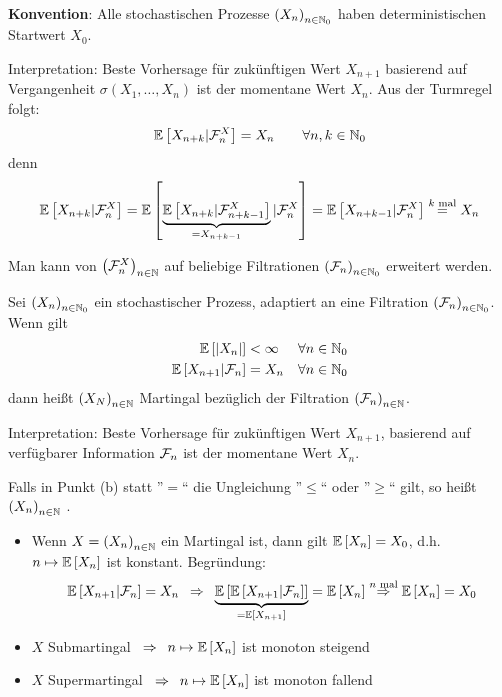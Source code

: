 \textbf{Konvention}: Alle stochastischen Prozesse $\left( X_n \right)_{n \in \mathbb{N}_0}$ haben deterministischen Startwert $X_0$.

Interpretation: Beste Vorhersage für zukünftigen Wert $X_{n+1}$ basierend auf Vergangenheit $\sigma(X_1,\dots,X_n)$ ist der momentane Wert $X_n$.
Aus der Turmregel folgt:
\begin{equation*}
	\EW[X_{n+k}|\F_n^X] = X_n \qquad \forall n,k \in \N_0 %
\end{equation*}
denn
\begin{equation*}
	\mathbb{E} \left[ X_{n+k}|\mathcal{F}_n^X \right] = \mathbb{E} \left[ \underbrace{\mathbb{E} \left[ X_{n+k}|\mathcal{F}_{n+k-1}^X \right]}_{=X_{n+k-1}}|\mathcal{F}_n^X \right] = \mathbb{E} \left[ X_{n+k-1}|\mathcal{F}_n^X \right] \overset{k \text{ mal}}{=} X_n
\end{equation*}

Man kann von $\left( \mathcal{F}_n^X \right)_{n \in \mathbb{N}}$ auf beliebige Filtrationen $\left( \mathcal{F}_n \right)_{n \in \mathbb{N}_0}$ erweitert werden.

\begin{*definition}
	Sei $\left( X_n \right)_{n \in \mathbb{N}_0}$ ein stochastischer Prozess, adaptiert an eine Filtration $\left( \mathcal{F}_n \right)_{n \in \mathbb{N}_0}$. Wenn gilt
	\begin{alignat*}{2}
		\EW[\abs{X_n}] &< \infty &\forall n \in \N_0 \\ %
		\EW[X_{n+1}|\F_n] &= X_n &\forall n \in \N_0    %
	\end{alignat*}
	dann heißt $\left( X_N \right)_{n \in \mathbb{N}}$ Martingal bezüglich der Filtration $\left( \mathcal{F}_n \right)_{n \in \mathbb{N}}$.
\end{*definition}

Interpretation: Beste Vorhersage für zukünftigen Wert $X_{n+1}$, basierend auf verfügbarer Information $\mathcal{F}_n$ ist der momentane Wert $X_n$.

\begin{*definition}
	Falls in Punkt (b) statt ''$=$`` die Ungleichung ''$\le$`` oder ''$\ge$`` gilt, so heißt $\left( X_n \right)_{n \in \mathbb{N}}$ .
\end{*definition}

\begin{itemize}
	\item Wenn $X=\left( X_n \right)_{n \in \mathbb{N}}$ ein Martingal ist, dann gilt $\mathbb{E} \left[ X_n \right] = X_0$, d.h. $n \mapsto \mathbb{E} \left[ X_n \right]$ ist konstant. Begründung:
	\begin{equation*}
	\mathbb{E} \left[ X_{n+1}|\mathcal{F}_n \right] = X_n \enskip \Rightarrow \enskip \underbrace{\mathbb{E} \left[ {\mathbb{E} \left[ X_{n+1}|\mathcal{F}_n \right]} \right]}_{= \mathbb{E} \left[ X_{n+1} \right]} = \mathbb{E} \left[ X_n \right] \overset{n \text{ mal}}{\enskip \Rightarrow \enskip} \mathbb{E} \left[ X_n \right] = X_0
	\end{equation*}
	\item $X$ Submartingal $\enskip \Rightarrow \enskip n \mapsto \mathbb{E} \left[ X_n \right]$ ist monoton steigend
	\item $X$ Supermartingal $\enskip \Rightarrow \enskip n \mapsto \mathbb{E} \left[ X_n \right]$ ist monoton fallend
\end{itemize}

